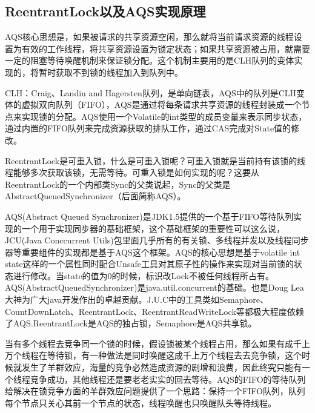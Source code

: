 \documentclass[../../../interview-questions.tex]{subfiles}
\begin{document}
\subsection{ReentrantLock以及AQS实现原理}

AQS核心思想是，如果被请求的共享资源空闲，那么就将当前请求资源的线程设置为有效的工作线程，将共享资源设置为锁定状态；如果共享资源被占用，就需要一定的阻塞等待唤醒机制来保证锁分配。这个机制主要用的是CLH队列的变体实现的，将暂时获取不到锁的线程加入到队列中。

CLH：Craig、Landin and Hagersten队列，是单向链表，AQS中的队列是CLH变体的虚拟双向队列（FIFO），AQS是通过将每条请求共享资源的线程封装成一个节点来实现锁的分配。AQS使用一个Volatile的int类型的成员变量来表示同步状态，通过内置的FIFO队列来完成资源获取的排队工作，通过CAS完成对State值的修改。

ReentrantLock是可重入锁，什么是可重入锁呢？可重入锁就是当前持有该锁的线程能够多次获取该锁，无需等待。可重入锁是如何实现的呢？这要从ReentrantLock的一个内部类Sync的父类说起，Sync的父类是AbstractQueuedSynchronizer（后面简称AQS）。

AQS(Abstract Queued Synchronizer)是JDK1.5提供的一个基于FIFO等待队列实现的一个用于实现同步器的基础框架，这个基础框架的重要性可以这么说，JCU(Java Conccurrent Utils)包里面几乎所有的有关锁、多线程并发以及线程同步器等重要组件的实现都是基于AQS这个框架。AQS的核心思想是基于volatile int state这样的一个属性同时配合Unsafe工具对其原子性的操作来实现对当前锁的状态进行修改。当state的值为0的时候，标识改Lock不被任何线程所占有。AQS(AbstractQueuedSynchronizer)是java.util.concurrent的基础。也是Doug Lea大神为广大java开发作出的卓越贡献。J.U.C中的工具类如Semaphore、CountDownLatch、ReentrantLock、ReentrantReadWriteLock等都极大程度依赖了AQS.ReentrantLock是AQS的独占锁，Semaphore是AQS共享锁。

当有多个线程去竞争同一个锁的时候，假设锁被某个线程占用，那么如果有成千上万个线程在等待锁，有一种做法是同时唤醒这成千上万个线程去去竞争锁，这个时候就发生了羊群效应，海量的竞争必然造成资源的剧增和浪费，因此终究只能有一个线程竞争成功，其他线程还是要老老实实的回去等待。AQS的FIFO的等待队列给解决在锁竞争方面的羊群效应问题提供了一个思路：保持一个FIFO队列，队列每个节点只关心其前一个节点的状态，线程唤醒也只唤醒队头等待线程。
\end{document}
